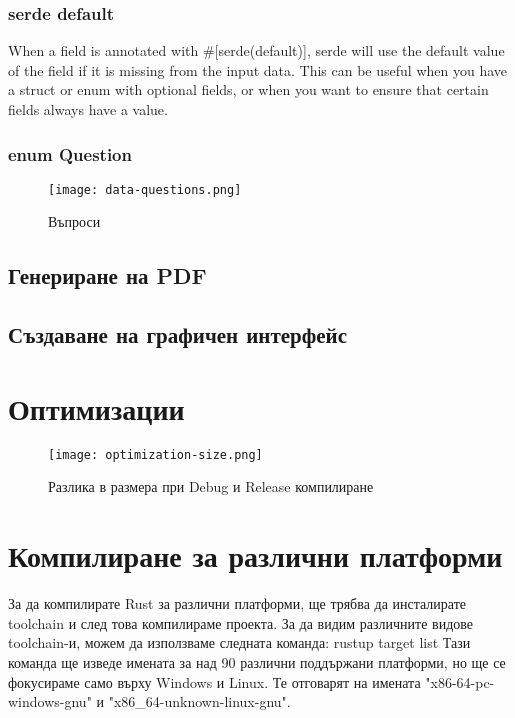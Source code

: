 \subsubsection{serde default}
When a field is annotated with \#[serde(default)], serde will use the default
value of the field if it is missing from the input data. This can be useful
when you have a struct or enum with optional fields, or when you want to ensure
that certain fields always have a value.


\subsubsection{enum Question}
\begin{figure}[!htb]
  \texttt{[image: data-questions.png]}
  \centering
  \caption{Въпроси}
  \label{fig:data-questions}
\end{figure}

\subsection{Генериране на PDF}
\subsection{Създаване на графичен интерфейс}

\section{Оптимизации}
\begin{figure}[!htb]
  \texttt{[image: optimization-size.png]}
  \centering
  \caption{Разлика в размера при Debug и Release компилиране}
  \label{fig:optimization-size}
\end{figure}

\section{Компилиране за различни платформи}
За да компилирате Rust за различни платформи, ще трябва да инсталирате
toolchain и след това компилираме проекта. За да видим различните видове
toolchain-и, можем да използваме следната команда:
rustup target list
Тази команда ще изведе имената за над 90 различни поддържани платформи, но ще
се фокусираме само върху Windows и Linux. Те отговарят на имената
"x86-64-pc-windows-gnu" и "x86\_64-unknown-linux-gnu".

